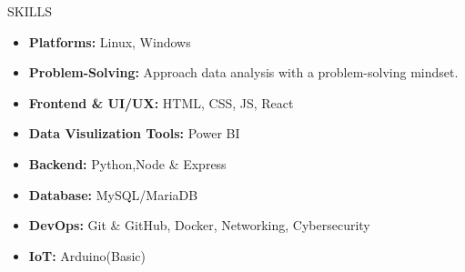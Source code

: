 \documentclass{resume}
\begin{document}
\vspace{-0.2em}
\begin{rSection}{SKILLS}
    \begin{itemize}
        \item \textbf{Platforms:} Linux, Windows
              \vspace{-0.6em}
        \item \textbf{Problem-Solving:} Approach data analysis with a problem-solving mindset.
              \vspace{-0.6em}
        \item \textbf{Frontend \& UI/UX: } HTML, CSS, JS, React 
              \vspace{-0.7em}
        \item \textbf{Data Visulization Tools:} Power BI
         \vspace{-0.6em}
        \item \textbf{Backend: } Python,Node \& Express
              \vspace{-0.6em}
        \item \textbf{Database: } MySQL/MariaDB
              \vspace{-0.6em}
        \item \textbf{DevOps:} Git \& GitHub, Docker, Networking, Cybersecurity
              \vspace{-0.6em}
        \item \textbf{IoT:} Arduino(Basic)
    \end{itemize}
\end{rSection}
\vspace{-0.6em}
\end{document}
